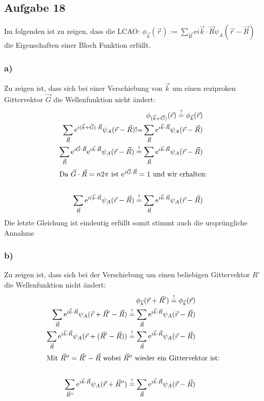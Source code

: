 \subsection*{Aufgabe 18}
Im folgenden ist zu zeigen, dass die LCAO: $ \phi_{\vec k}(\vec r) := \sum_{\vec R} \mathrm{e}{i\vec k\cdot \vec R}\psi_A(\vec r - \vec R)$ die Eigenschaften einer Bloch Funktion erfüllt.
\subsubsection*{a)}
Zu zeigen ist, dass sich bei einer Verschiebung von $\vec k$ um einen reziproken Gittervektor $\vec G$ die Wellenfunktion nicht ändert:
\begin{align*}
\phi_{(\vec k+\vec G)}(\vec r) \overset{!}{=} \phi_{\vec k}(\vec r)\\
\sum_{\vec R} \mathrm{e}^{i(\vec k+\vec G)\cdot \vec R}\psi_A(\vec r - \vec R) {!}{=} \sum_{\vec R} \mathrm{e}^{i\vec k\cdot \vec R}\psi_A(\vec r - \vec R)\\
\sum_{\vec R} \mathrm{e}^{i\vec G \cdot \vec R}\mathrm{e}^{i\vec k\cdot \vec R}\psi_A(\vec r - \vec R) \overset{!}{=} \sum_{\vec R} \mathrm{e}^{i\vec k\cdot \vec R}\psi_A(\vec r - \vec R)\\
\intertext{Da $\vec G \cdot \vec R = n2\pi$ ist $\mathrm{e}^{i\vec G \cdot \vec R} = 1$ und wir erhalten:}\\
\sum_{\vec R} \mathrm{e}^{i(\vec k\cdot \vec R}\psi_A(\vec r - \vec R) \overset{!}{=} \sum_{\vec R} \mathrm{e}^{i\vec k\cdot \vec R}\psi_A(\vec r - \vec R)\\
\end{align*}
Die letzte Gleichung ist eindeutig erfüllt somit stimmt auch die ursprüngliche Annahme
\subsubsection*{b)}
Zu zeigen ist, dass sich bei der Verschiebung um einen beliebigen Gittervektor $R'$ die Wellenfunktion nicht ändert:
\begin{align*}
\phi_{\vec k}(\vec r+\vec R') \overset{!}{=} \phi_{\vec k}(\vec r)\\
\sum_{\vec R} \mathrm{e}^{i\vec k\cdot \vec R}\psi_A(\vec r + \vec R' - \vec R) \overset{!}{=} \sum_{\vec R} \mathrm{e}^{i\vec k\cdot \vec R}\psi_A(\vec r - \vec R)\\
\sum_{\vec R} \mathrm{e}^{i\vec k\cdot \vec R}\psi_A(\vec r + (\vec R' - \vec R)) \overset{!}{=} \sum_{\vec R} \mathrm{e}^{i\vec k\cdot \vec R}\psi_A(\vec r - \vec R)\\
\intertext{Mit $\vec R'' = \vec R' -\vec R$ wobei $\vec R''$ wieder ein Gittervektor ist:}\\
\sum_{\vec R''} \mathrm{e}^{i\vec k\cdot \vec R}\psi_A(\vec r + \vec R'') \overset{!}{=} \sum_{\vec R} \mathrm{e}^{i\vec k\cdot \vec R}\psi_A(\vec r - \vec R)\\
\end{align*}

